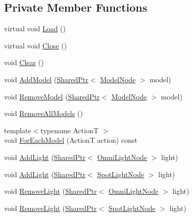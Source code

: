 \subsection*{Private Member Functions}
\begin{DoxyCompactItemize}
\item 
virtual void \hyperlink{classmage_1_1_scene_a1fb4a93eaa2f6a9e20594e205abb9a32}{Load} ()
\item 
virtual void \hyperlink{classmage_1_1_scene_a16786d7fcf0b813e2e94061b082cfd1d}{Close} ()
\item 
void \hyperlink{classmage_1_1_scene_a916cc7a0867bf1c09e5d10de53192140}{Clear} ()
\item 
void \hyperlink{classmage_1_1_scene_acfd5cf0484e1814cb265604ed970335f}{Add\+Model} (\hyperlink{namespacemage_a1e01ae66713838a7a67d30e44c67703e}{Shared\+Ptr}$<$ \hyperlink{classmage_1_1_model_node}{Model\+Node} $>$ model)
\item 
void \hyperlink{classmage_1_1_scene_a1b66a3d247eaa143234d15d72aa67a85}{Remove\+Model} (\hyperlink{namespacemage_a1e01ae66713838a7a67d30e44c67703e}{Shared\+Ptr}$<$ \hyperlink{classmage_1_1_model_node}{Model\+Node} $>$ model)
\item 
void \hyperlink{classmage_1_1_scene_a5dffc6ff3e40981087cbfc2462e5b84a}{Remove\+All\+Models} ()
\item 
{\footnotesize template$<$typename ActionT $>$ }\\void \hyperlink{classmage_1_1_scene_a6327548021f874f22a1adc81cfc8a1ea}{For\+Each\+Model} (ActionT action) const
\item 
void \hyperlink{classmage_1_1_scene_a6ce8182afe3c1f39249ec08b62aee317}{Add\+Light} (\hyperlink{namespacemage_a1e01ae66713838a7a67d30e44c67703e}{Shared\+Ptr}$<$ \hyperlink{namespacemage_a1724c6e6b6b5ba535cdd967cbbb4a669}{Omni\+Light\+Node} $>$ light)
\item 
void \hyperlink{classmage_1_1_scene_aeeba74ee789d4917ed72b179f16c1222}{Add\+Light} (\hyperlink{namespacemage_a1e01ae66713838a7a67d30e44c67703e}{Shared\+Ptr}$<$ \hyperlink{namespacemage_aeed5dee4ff6c591eabb0e9114256df4a}{Spot\+Light\+Node} $>$ light)
\item 
void \hyperlink{classmage_1_1_scene_a1da46b19f87d387af18d2f7fc37bb6d7}{Remove\+Light} (\hyperlink{namespacemage_a1e01ae66713838a7a67d30e44c67703e}{Shared\+Ptr}$<$ \hyperlink{namespacemage_a1724c6e6b6b5ba535cdd967cbbb4a669}{Omni\+Light\+Node} $>$ light)
\item 
void \hyperlink{classmage_1_1_scene_a371c31d030990b9fa641271c4c733d87}{Remove\+Light} (\hyperlink{namespacemage_a1e01ae66713838a7a67d30e44c67703e}{Shared\+Ptr}$<$ \hyperlink{namespacemage_aeed5dee4ff6c591eabb0e9114256df4a}{Spot\+Light\+Node} $>$ light)

\end{DoxyCompactItemize}
